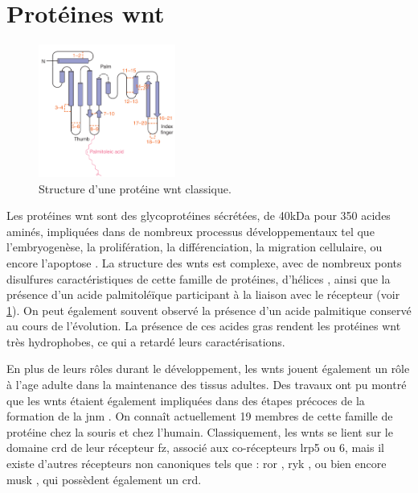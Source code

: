 \section{Protéines \Acrshort{wnt}}
	\label{sec:IntroWnt}

	\begin{figure}
		\includegraphics[width=0.4\textwidth]{./Images/WntProtein.png}	
		\caption{Structure d'une protéine \Gls{wnt} classique.}
		\label{fig:WntProt}
	\end{figure}
	
	Les protéines \gls{wnt} sont des glycoprotéines sécrétées, de 40kDa pour 350 acides aminés, impliquées dans de nombreux processus développementaux tel que l'embryogenèse, la prolifération, la différenciation, la migration cellulaire, ou encore l'apoptose \cite{Miller2002, Willert2012}. La structure des \Glspl{wnt} est complexe, avec  de nombreux ponts disulfures caractéristiques de cette famille de protéines, d'hélices \textalpha{}, ainsi que la présence d'un acide palmitoléïque participant à la liaison avec le récepteur (voir \cref{fig:WntProt}). On peut également souvent observé la présence d'un acide palmitique conservé au cours de l'évolution. La présence de ces acides gras rendent les protéines \Gls{wnt} très hydrophobes, ce qui a retardé leurs caractérisations.
	
	En plus de leurs rôles durant le développement, les \Glspl{wnt} jouent également un rôle à l'age adulte dans la maintenance des tissus adultes. Des travaux ont pu montré que les \Glspl{wnt} étaient également impliquées dans des étapes précoces de la formation de la \gls{jnm} \cite{Hall2000}. On connaît actuellement 19 membres de cette famille de protéine chez la souris et chez l'humain. Classiquement, les \Glspl{wnt} se lient sur le domaine \gls{crd} de leur récepteur \gls{fz}, associé aux co-récepteurs \gls{lrp}5 ou 6, mais il existe d'autres récepteurs non canoniques tels que : \gls{ror} \cite{Cadigan2006, Gordon2006, Green2008}, \gls{ryk} \cite{Bovolenta2006, Fradkin2010}, ou bien encore \gls{musk} \cite{Jing2009}, qui possèdent également un \gls{crd}.
	

